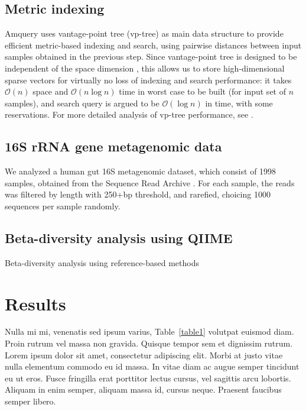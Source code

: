 \documentclass[10pt,letterpaper]{article}
\begin{document}
\subsection*{Metric indexing}
Amquery uses vantage-point tree (vp-tree) \cite{yianilos1993data, chavez2001searching} as main data structure to provide efficient metric-based indexing and search, using pairwise distances between input 
samples obtained in the previous step.
Since vantage-point tree is designed to be independent of the space dimension \cite{yianilos1993data}, this allows us to store high-dimensional sparse vectors for virtually no loss of indexing and 
search performance: it takes $\mathcal{O}(n)$ space and $\mathcal{O}(n \log n)$ time in worst case to be built (for input set of $n$ samples), and search query is argued to be $\mathcal{O}(\log n)$ in time, with some reservations. 
For more detailed analysis of vp-tree performance, see \cite{yianilos1993data}.


\subsection*{16S rRNA gene metagenomic data}
We analyzed a human gut 16S metagenomic dataset, which consist of 1998 samples, obtained from the Sequence Read Archive \cite{leinonen2010sequence}. 
For each sample, the reads was filtered by length with 250+bp threshold, and rarefied, choicing 1000 sequences per sample randomly.


\subsection*{Beta-diversity analysis using QIIME}
Beta-diversity analysis using reference-based methods


\section*{Results}
Nulla mi mi, venenatis sed ipsum varius, Table~\ref{table1} volutpat euismod diam. Proin rutrum vel massa non gravida. Quisque tempor sem et dignissim rutrum. Lorem ipsum dolor sit amet, consectetur adipiscing elit. Morbi at justo vitae nulla elementum commodo eu id massa. In vitae diam ac augue semper tincidunt eu ut eros. Fusce fringilla erat porttitor lectus cursus, vel sagittis arcu lobortis. Aliquam in enim semper, aliquam massa id, cursus neque. Praesent faucibus semper libero.
\end{document}
